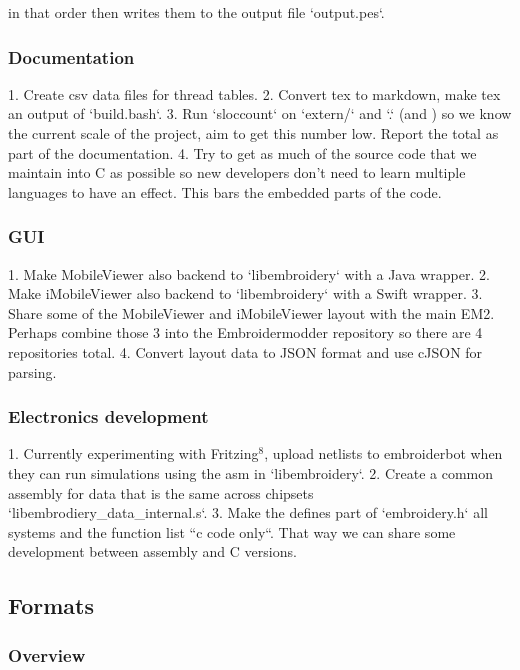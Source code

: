 \documentclass[a4paper, 11pt]{report}
\begin{document}
in that order then writes them to the output file `output.pes`.

\subsubsection{Documentation}

1. Create csv data files for thread tables.
2. Convert tex to markdown, make tex an output of `build.bash`.
3. Run `sloccount` on `extern/` and `.` (and ) so we know the current scale
   of the project, aim to get this number low. Report the total as part of
   the documentation.
4. Try to get as much of the source code that we maintain into C as possible
   so new developers don't need to learn multiple languages to have an effect.
   This bars the embedded parts of the code. 

\subsubsection{GUI}

1. Make MobileViewer also backend to `libembroidery` with a Java wrapper.
2. Make iMobileViewer also backend to `libembroidery` with a Swift wrapper.
3. Share some of the MobileViewer and iMobileViewer layout with the main
   EM2. Perhaps combine those 3 into the Embroidermodder repository so there
   are 4 repositories total.
4. Convert layout data to JSON format and use cJSON for parsing.

\subsubsection{Electronics development}

1. Currently experimenting with Fritzing$^{8}$, upload netlists to embroiderbot
   when they can run simulations using the asm in `libembroidery`.
2. Create a common assembly for data that is the same across chipsets
   `libembrodiery\_data\_internal.s`.
3. Make the defines part of `embroidery.h` all systems and the function list
   ``c code only``. That way we can share some development between assembly and C
   versions.

\subsection{Formats}

\subsubsection{Overview}
\end{document}
